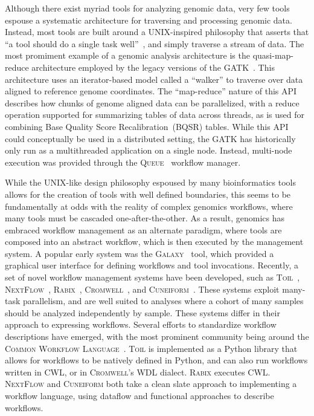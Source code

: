 \documentclass[phd]{ucbthesis}
\begin{document}
Although there exist myriad tools for analyzing genomic data, very few tools
espouse a systematic architecture for traversing and processing genomic data.
Instead, most tools are built around a UNIX-inspired philosophy that asserts
that ``a tool should do a single task well''~\cite{rodriguez11}, and simply
traverse a stream of data. The most promiment example of a genomic analysis
architecture is the quasi-map-reduce architecture employed by the legacy
versions of the GATK~\cite{mckenna10}. This architecture uses an iterator-based
model called a ``walker'' to traverse over data aligned to reference genome
coordinates. The ``map-reduce'' nature of this API describes how chunks of
genome aligned data can be parallelized, with a reduce operation supported
for summarizing tables of data across threads, as is used for combining
Base Quality Score Recalibration~(BQSR) tables. While this API could
conceptually be used in a distributed setting, the GATK has historically
only run as a multithreaded application on a single node. Instead,
multi-node execution was provided through the \textsc{Queue}~\cite{depristo11}
workflow manager.

While the UNIX-like design philosophy espoused by many bioinformatics tools
allows for the creation of tools with well defined boundaries, this seems to be
fundamentally at odds with the reality of complex genomics workflows, where many
tools must be cascaded one-after-the-other. As a result, genomics has embraced
workflow management as an alternate paradigm, where tools are composed into an
abstract workflow, which is then executed by the management system. A popular
early system was the \textsc{Galaxy}~\cite{goecks10} tool, which provided a
graphical user interface for defining workflows and tool invocations. Recently,
a set of novel workflow management systems have been developed, such as
\textsc{Toil}~\cite{vivian17}, \textsc{NextFlow}~\cite{ditommaso17},
\textsc{Rabix}~\cite{kaushik16}, \textsc{Cromwell}~\cite{cromwell},
and \textsc{Cuneiform}~\cite{brandt15}. These systems exploit many-task
parallelism, and are well suited to analyses where a cohort of many samples
should be analyzed independently by sample. These systems differ in their
approach to expressing workflows. Several efforts to standardize workflow
descriptions have emerged, with the most prominent community being around the
\textsc{Common Workflow Language}~\cite{cwl}. \textsc{Toil} is implemented as
a Python library that allows for workflows to be natively defined in Python,
and can also run workflows written in CWL, or in \textsc{Cromwell}'s WDL
dialect. \textsc{Rabix} executes CWL. \textsc{NextFlow} and \textsc{Cuneiform}
both take a clean slate approach to implementing a workflow language, using
dataflow and functional approaches to describe workflows.
\end{document}
